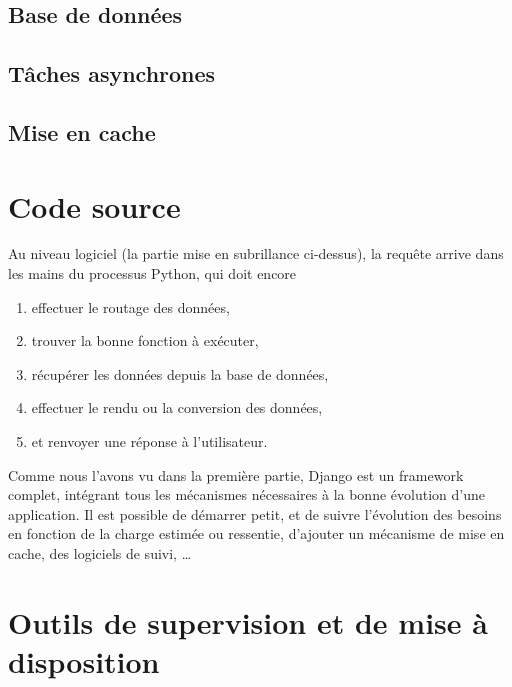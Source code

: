 \documentclass[11pt]{amsbook}
\begin{document}
\hypertarget{x-base-de-données}{\section{Base de données}}

\hypertarget{x-tâches-asynchrones}{\section{Tâches asynchrones}}

\hypertarget{x-mise-en-cache}{\section{Mise en cache}}

\hypertarget{x-code-source}{\chapter{Code source}}
Au niveau logiciel (la partie mise en subrillance ci-dessus), la requête arrive dans les mains du processus Python, qui doit encore


\begin{enumerate}

\item{effectuer le routage des données,}

\item{trouver la bonne fonction à exécuter,}

\item{récupérer les données depuis la base de données,}

\item{effectuer le rendu ou la conversion des données,}

\item{et renvoyer une réponse à l’utilisateur.}

\end{enumerate}


Comme nous l’avons vu dans la première partie, Django est un framework complet, intégrant tous les mécanismes nécessaires à la bonne évolution d’une application.
Il est possible de démarrer petit, et de suivre l’évolution des besoins en fonction de la charge estimée ou ressentie, d’ajouter un mécanisme de mise en cache, des logiciels de suivi, …​


\hypertarget{x-outils-de-supervision-et-de-mise-à-disposition}{\chapter{Outils de supervision et de mise à disposition}}
\end{document}

